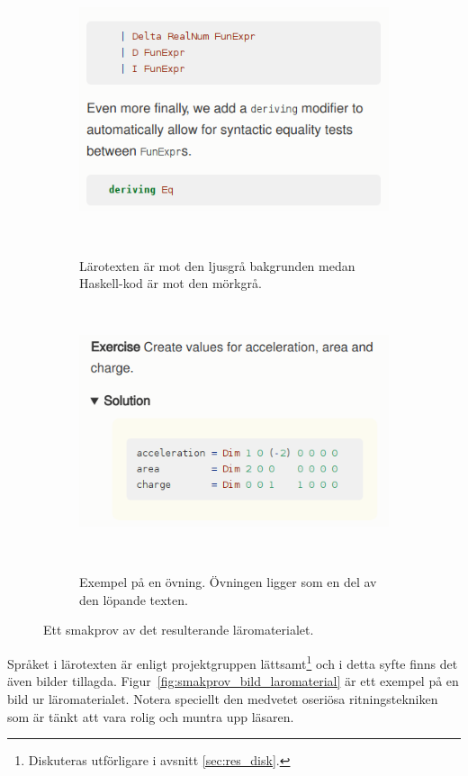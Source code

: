 \begin{figure}[h]
    \centering
    \begin{subfigure}[t]{0.5\textwidth}
        \centering
        \includegraphics[width=0.9\linewidth]{figure/smakprov_laromaterial.png}
        \caption{Lärotexten är mot den ljusgrå bakgrunden medan Haskell-kod är mot den mörkgrå.}~\label{fig:smakprov_laromaterial}
    \end{subfigure}%
    ~~~
    \begin{subfigure}[t]{0.5\textwidth}
        \centering
        \includegraphics[width=0.9\linewidth]{figure/smakprov_ovning.png}
        \caption{Exempel på en övning. Övningen ligger som en del av den
                 löpande texten.}~\label{fig:smakprov_ovning}
    \end{subfigure}
    \caption{Ett smakprov av det resulterande läromaterialet.}
\end{figure}

Språket i lärotexten är enligt projektgruppen lättsamt\footnote{Diskuteras
utförligare i avsnitt \ref{sec:res_disk}.} och i detta syfte finns det även
bilder tillagda. Figur~\ref{fig:smakprov_bild_laromaterial} är ett exempel på en
bild ur läromaterialet. Notera speciellt den medvetet oseriösa ritningstekniken
som är tänkt att vara rolig och muntra upp läsaren.\newline

